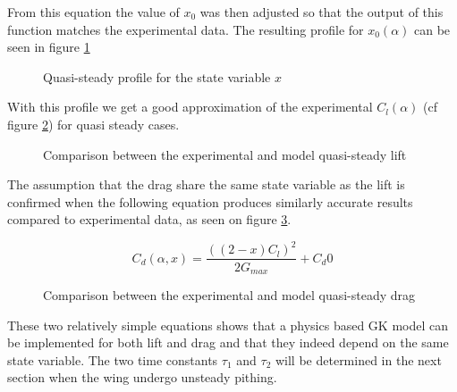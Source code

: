 \par From this equation the value of $x_0$ was then adjusted so that the output of this function matches the experimental data. 
The resulting profile for $x_0(\alpha)$ can be seen in figure \ref{fig:x_0_vs_alpha}

\begin{figure}[h]
	\begin{center}
	\end{center}
	\caption{Quasi-steady profile for the state variable $x$}
	\label{fig:x_0_vs_alpha}
\end{figure}

With this profile we get a good approximation of the experimental $C_l(\alpha)$ (cf figure \ref{fig:GK_Cl_vs_alpha}) for quasi steady cases.

\begin{figure}[h]
	\begin{center}
	\end{center}
	\caption{Comparison between the experimental and model quasi-steady lift}
	\label{fig:GK_Cl_vs_alpha}
\end{figure}

\par The assumption that the drag share the same state variable as the lift is confirmed when the following equation produces similarly accurate results compared to experimental data, as seen on figure \ref{fig:GK_Cd_vs_alpha}.

\begin{equation}
	C_d(\alpha,x)= \frac{ \left( \left( 2 - x \right)C_l \right)^2 }{2 G_{max}} + C_d0
	\label{eqn:Cd_function}
\end{equation}

\begin{figure}[h]
	\begin{center}
	\end{center}
	\caption{Comparison between the experimental and model quasi-steady drag}
	\label{fig:GK_Cd_vs_alpha}
\end{figure}

\par These two relatively simple equations shows that a physics based GK model can be implemented for both lift and drag and that they indeed depend on the same state variable.
The two time constants $\tau_1$ and $\tau_2$ will be determined in the next section when the wing undergo unsteady pithing.


